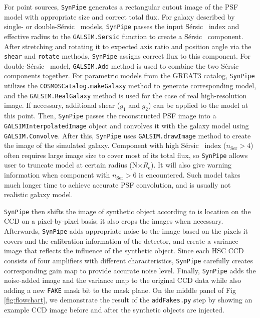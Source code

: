 \documentclass[useamsfonts]{pasj01}
\def\ser{{S\'{e}rsic\ }}
\def\synpipe{\texttt{SynPipe}}
\def\galsim{\texttt{G}{\scriptsize \texttt{AL}}\texttt{S}{\scriptsize \texttt{IM}}}
\begin{document}
    For point sources, \synpipe{} generates a rectangular cutout image of the PSF model 
    with appropriate size and correct total flux. 
    For galaxy described by single- or double-\ser{} models, \synpipe{} passes the input 
    \ser{} index and effective radius to the \galsim{}\texttt{.Sersic} function to 
    create a \ser{} component.
    After stretching and rotating it to expected axis ratio and position angle 
    via the \texttt{shear} and \texttt{rotate} methods, \synpipe{} assigns correct flux 
    to this component. 
    For double-\ser{} model, \galsim{}\texttt{.Add} method is used to combine the two 
    \ser{} components together. 
    For parametric models from the GREAT3 catalog, \synpipe{} utilizes the 
    \texttt{COSMOSCatalog.makeGalaxy} method to generate corresponding model, 
    and the \galsim{}\texttt{.RealGalaxy} method is used for the case of real 
    high-resolution image. 
    If necessary, additional shear ($g_1$ and $g_2$) can be applied to the model at this 
    point. 
    Then, \synpipe{} passes the reconstructed PSF image into a 
    \galsim{}\texttt{InterpolatedImage} object and convolves it with the galaxy model  
    using \galsim{}\texttt{.Convolve}. 
    After this, \synpipe{} uses \galsim{}\texttt{.drawImage} method to create the image 
    of the simulated galaxy. 
    Component with high \ser{} index ($n_{\mathrm{Ser}} > 4$) often requires large image 
    size to cover most of its total flux, so \synpipe{} allows user to truncate model 
    at certain radius (N$\times R_{\mathrm{e}}$). 
    It will also give warning information when component with $n_{\mathrm{Ser}} > 6$ is 
    encountered. 
    Such model takes much longer time to achieve accurate PSF convolution, and is usually 
    not realistic galaxy model. 
    
    \synpipe{} then shifts the image of synthetic object according to is location on the 
    CCD on a pixel-by-pixel basis; it also crops the images when necessary. 
    Afterwards, \synpipe{} adds appropriate noise to the image based on the pixels it 
    covers and the calibration information of the detector, and create a variance image 
    that reflects the influence of the synthetic object. 
    Since each HSC CCD consists of four amplifiers with different characteristics, 
    \synpipe{} carefully creates corresponding gain map to provide accurate noise level. 
    Finally, \synpipe{} adds the noise-added image and the variance map to the original 
    CCD data while also adding a new \texttt{FAKE} mask bit to the mask plane. 
    On the middle panel of Fig \ref{fig:flowchart}, we demonstrate the result of the 
    \texttt{addFakes.py} step by showing an example CCD image before and after the 
    synthetic objects are injected. 
    
\end{document}

